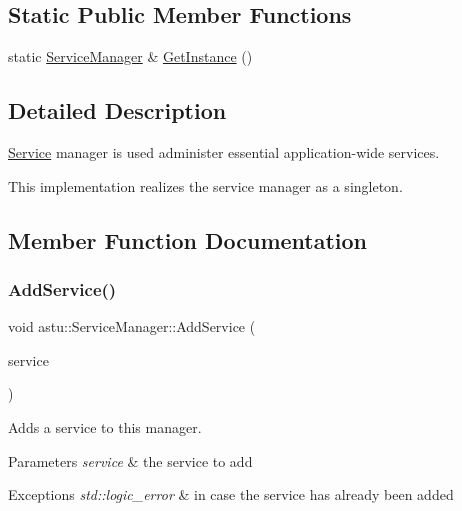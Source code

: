 \subsection*{Static Public Member Functions}
\begin{DoxyCompactItemize}
\item 
static \hyperlink{classastu_1_1ServiceManager}{Service\+Manager} \& \hyperlink{classastu_1_1ServiceManager_a26941fe98ea3f2792deca62e4124bf15}{Get\+Instance} ()
\end{DoxyCompactItemize}


\subsection{Detailed Description}
\hyperlink{classastu_1_1Service}{Service} manager is used administer essential application-\/wide services.

This implementation realizes the service manager as a singleton. 

\subsection{Member Function Documentation}
\mbox{\label{classastu_1_1ServiceManager_a274475bef03cea4810f98082cdb24295}} 
\subsubsection{\texorpdfstring{Add\+Service()}{AddService()}}
{\footnotesize\ttfamily void astu\+::\+Service\+Manager\+::\+Add\+Service (\begin{DoxyParamCaption}\item[{std\+::shared\+\_\+ptr$<$ \hyperlink{classastu_1_1Service}{Service} $>$}]{service }\end{DoxyParamCaption})}

Adds a service to this manager.


\begin{DoxyParams}{Parameters}
{\em service} & the service to add \\
\hline
\end{DoxyParams}

\begin{DoxyExceptions}{Exceptions}
{\em std\+::logic\+\_\+error} & in case the service has already been added \\
\hline
\end{DoxyExceptions}
\mbox{\label{classastu_1_1ServiceManager_acef5ab6b48a9811b810851c69751f71a}} 
